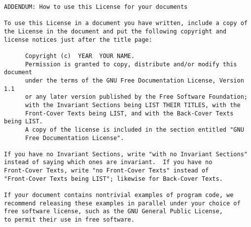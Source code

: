 \documentclass[12pt]{article}
\begin{document}
\begin{verbatim}
ADDENDUM: How to use this License for your documents

To use this License in a document you have written, include a copy of
the License in the document and put the following copyright and
license notices just after the title page:

      Copyright (c)  YEAR  YOUR NAME.
      Permission is granted to copy, distribute and/or modify this document
      under the terms of the GNU Free Documentation License, Version 1.1
      or any later version published by the Free Software Foundation;
      with the Invariant Sections being LIST THEIR TITLES, with the
      Front-Cover Texts being LIST, and with the Back-Cover Texts being LIST.
      A copy of the license is included in the section entitled "GNU
      Free Documentation License".

If you have no Invariant Sections, write "with no Invariant Sections"
instead of saying which ones are invariant.  If you have no
Front-Cover Texts, write "no Front-Cover Texts" instead of
"Front-Cover Texts being LIST"; likewise for Back-Cover Texts.

If your document contains nontrivial examples of program code, we
recommend releasing these examples in parallel under your choice of
free software license, such as the GNU General Public License,
to permit their use in free software.
\end{verbatim}
\end{document}
